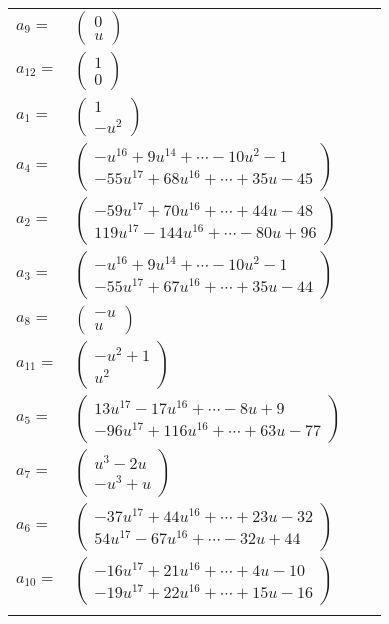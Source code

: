 \documentclass[1p]{elsarticle_modified}
\theoremstyle{definition}
\begin{document}
\begin{tabular}{m{7pt} m{180pt} m{7pt} m{180pt} }
\flushright $a_{9}=$&$\begin{pmatrix}0\\u\end{pmatrix}$ \\
\flushright $a_{12}=$&$\begin{pmatrix}1\\0\end{pmatrix}$ \\
\flushright $a_{1}=$&$\begin{pmatrix}1\\- u^2\end{pmatrix}$ \\
\flushright $a_{4}=$&$\begin{pmatrix}- u^{16}+9 u^{14}+\cdots-10 u^2-1\\-55 u^{17}+68 u^{16}+\cdots+35 u-45\end{pmatrix}$ \\
\flushright $a_{2}=$&$\begin{pmatrix}-59 u^{17}+70 u^{16}+\cdots+44 u-48\\119 u^{17}-144 u^{16}+\cdots-80 u+96\end{pmatrix}$ \\
\flushright $a_{3}=$&$\begin{pmatrix}- u^{16}+9 u^{14}+\cdots-10 u^2-1\\-55 u^{17}+67 u^{16}+\cdots+35 u-44\end{pmatrix}$ \\
\flushright $a_{8}=$&$\begin{pmatrix}- u\\u\end{pmatrix}$ \\
\flushright $a_{11}=$&$\begin{pmatrix}- u^2+1\\u^2\end{pmatrix}$ \\
\flushright $a_{5}=$&$\begin{pmatrix}13 u^{17}-17 u^{16}+\cdots-8 u+9\\-96 u^{17}+116 u^{16}+\cdots+63 u-77\end{pmatrix}$ \\
\flushright $a_{7}=$&$\begin{pmatrix}u^3-2 u\\- u^3+u\end{pmatrix}$ \\
\flushright $a_{6}=$&$\begin{pmatrix}-37 u^{17}+44 u^{16}+\cdots+23 u-32\\54 u^{17}-67 u^{16}+\cdots-32 u+44\end{pmatrix}$ \\
\flushright $a_{10}=$&$\begin{pmatrix}-16 u^{17}+21 u^{16}+\cdots+4 u-10\\-19 u^{17}+22 u^{16}+\cdots+15 u-16\end{pmatrix}$\\&\end{tabular}
\end{document}
